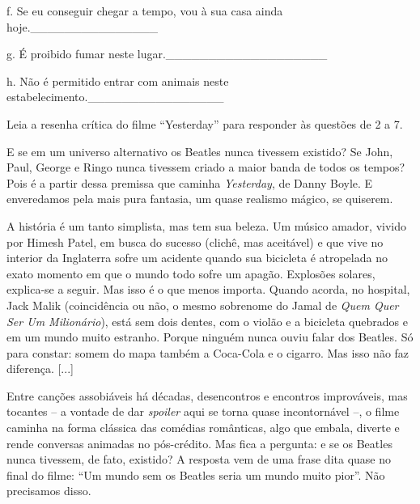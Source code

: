 f. Se eu conseguir chegar a tempo, vou à sua casa ainda
hoje.\_\_\_\_\_\_\_\_\_\_\_\_\_\_\_

g. É proibido fumar neste lugar.\_\_\_\_\_\_\_\_\_\_\_\_\_\_\_\_\_\_\_

h. Não é permitido entrar com animais neste
estabelecimento.\_\_\_\_\_\_\_\_\_\_\_\_\_\_\_\_


Leia a resenha crítica do filme ``Yesterday'' para responder às questões
de 2 a 7.

E se em um universo alternativo os Beatles nunca tivessem existido? Se
John, Paul, George e Ringo nunca tivessem criado a maior banda de todos
os tempos? Pois é a partir dessa premissa que caminha \emph{Yesterday},
de Danny Boyle. E enveredamos pela mais pura fantasia, um quase realismo
mágico, se quiserem.

A história é um tanto simplista, mas tem sua beleza. Um músico amador,
vivido por Himesh Patel, em busca do sucesso (clichê, mas aceitável) e
que vive no interior da Inglaterra sofre um acidente quando sua
bicicleta é atropelada no exato momento em que o mundo todo sofre um
apagão. Explosões solares, explica-se a seguir. Mas isso é o que menos
importa. Quando acorda, no hospital, Jack Malik (coincidência ou não, o
mesmo sobrenome do Jamal de \emph{Quem Quer Ser Um Milionário}), está
sem dois dentes, com o violão e a bicicleta quebrados e em um mundo
muito estranho. Porque ninguém nunca ouviu falar dos Beatles. Só para
constar: somem do mapa também a Coca-Cola e o cigarro. Mas isso não faz
diferença. {[}...{]}

Entre canções assobiáveis há décadas, desencontros e encontros
improváveis, mas tocantes -- a vontade de dar \emph{spoiler} aqui se
torna quase incontornável --, o filme caminha na forma clássica das
comédias românticas, algo que embala, diverte e rende conversas animadas
no pós-crédito. Mas fica a pergunta: e se os Beatles nunca tivessem, de
fato, existido? A resposta vem de uma frase dita quase no final do
filme: ``Um mundo sem os Beatles seria um mundo muito pior''. Não
precisamos disso.

